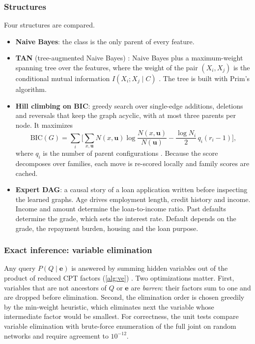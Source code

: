 \subsubsection{Structures}
Four structures are compared.
\begin{itemize}[nosep]
  \item \textbf{Naive Bayes}: the class is the only parent of every feature.
  \item \textbf{TAN} (tree-augmented Naive Bayes) \cite{friedman1997bnc}: Naive Bayes plus a maximum-weight spanning tree over the features, where the weight of the pair $(X_i, X_j)$ is the conditional mutual information $I(X_i; X_j \mid C)$ \cite{chowliu1968}. The tree is built with Prim's algorithm.
  \item \textbf{Hill climbing on BIC}: greedy search over single-edge additions, deletions and reversals that keep the graph acyclic, with at most three parents per node. It maximizes
  \begin{equation}
    \mathrm{BIC}(G) = \sum_{i} \Big[ \sum_{x, \bm{u}} N(x, \bm{u}) \log \frac{N(x, \bm{u})}{N(\bm{u})} - \frac{\log N_i}{2} \, q_i (r_i - 1) \Big],
  \end{equation}
  where $q_i$ is the number of parent configurations \cite{schwarz1978}. Because the score decomposes over families, each move is re-scored locally and family scores are cached.
  \item \textbf{Expert DAG}: a causal story of a loan application written before inspecting the learned graphs. Age drives employment length, credit history and income. Income and amount determine the loan-to-income ratio. Past defaults determine the grade, which sets the interest rate. Default depends on the grade, the repayment burden, housing and the loan purpose.
\end{itemize}

\subsubsection{Exact inference: variable elimination}
Any query $P(Q \mid \bm{e})$ is answered by summing hidden variables out of the product of reduced CPT factors (\cref{alg:ve}) \cite{zhangpoole1994}.
Two optimizations matter.
First, variables that are not ancestors of $Q$ or $\bm{e}$ are \emph{barren}: their factors sum to one and are dropped before elimination.
Second, the elimination order is chosen greedily by the min-weight heuristic, which eliminates next the variable whose intermediate factor would be smallest.
For correctness, the unit tests compare variable elimination with brute-force enumeration of the full joint on random networks and require agreement to $10^{-12}$.

